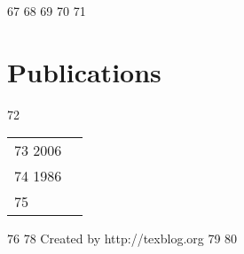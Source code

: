 \documentclass[10pt]{article}
\begin{document}
67	 
68	
69	
70	 
71	\section*{Publications}
72	\begin{tabular}{L!{\VRule}R}
73	2006&\vspace{5pt}\\
74	1986&\\
75	\end{tabular}
76	{\vspace{20pt}\newline{}	\vspace{20pt}
78	\scriptsize\hfill Created by http://texblog.org}
79	 
80	
\end{document}
